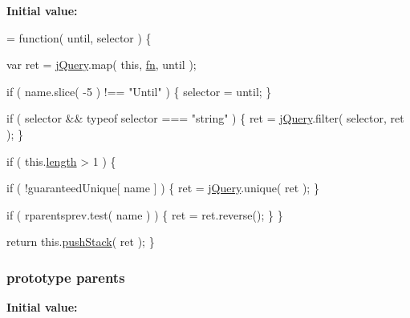 {\bfseries Initial value\-:}
\begin{DoxyCode}
= \textcolor{keyword}{function}( until, selector ) \{


        var ret = \hyperlink{jquery-1_810_82-vsdoc_8js_add5237586d970a38a81f990e8eb28c6c}{jQuery}.map( \textcolor{keyword}{this}, \hyperlink{jquery-1_810_82-vsdoc_8js_acef6bdaf6b9b20fdcca1ea86f0902c3b}{fn}, until );

        \textcolor{keywordflow}{if} ( name.slice( -5 ) !== \textcolor{stringliteral}{"Until"} ) \{
            selector = until;
        \}

        \textcolor{keywordflow}{if} ( selector && typeof selector === \textcolor{stringliteral}{"string"} ) \{
            ret = \hyperlink{jquery-1_810_82-vsdoc_8js_add5237586d970a38a81f990e8eb28c6c}{jQuery}.filter( selector, ret );
        \}

        \textcolor{keywordflow}{if} ( this.\hyperlink{jquery-1_810_82-vsdoc_8js_aa7de35d58da66d9944ab9cbe82c19640}{length} > 1 ) \{
            
            \textcolor{keywordflow}{if} ( !guaranteedUnique[ name ] ) \{
                ret = \hyperlink{jquery-1_810_82-vsdoc_8js_add5237586d970a38a81f990e8eb28c6c}{jQuery}.unique( ret );
            \}

            
            \textcolor{keywordflow}{if} ( rparentsprev.test( name ) ) \{
                ret = ret.reverse();
            \}
        \}

        \textcolor{keywordflow}{return} this.\hyperlink{jquery-1_810_82-vsdoc_8js_afc3a7db1ef2b526338c06c07cecccd44}{pushStack}( ret );
    \}
\end{DoxyCode}
\hypertarget{jquery-1_810_82-vsdoc_8js_a73895b5ab8d34f0181c620bc3a166cad}{
\subsubsection[{parents}]{ {\bf prototype} parents}}\label{jquery-1_810_82-vsdoc_8js_a73895b5ab8d34f0181c620bc3a166cad}
{\bfseries Initial value\-:}
